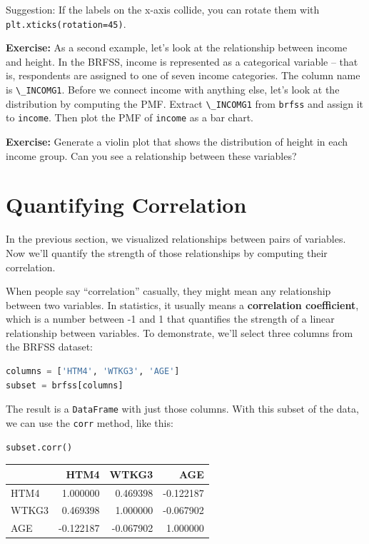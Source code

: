 Suggestion: If the labels on the x-axis collide, you can rotate them
with \passthrough{\lstinline!plt.xticks(rotation=45)!}.

\textbf{Exercise:} As a second example, let's look at the relationship
between income and height. In the BRFSS, income is represented as a
categorical variable -- that is, respondents are assigned to one of
seven income categories. The column name is
\passthrough{\lstinline!\_INCOMG1!}. Before we connect income with
anything else, let's look at the distribution by computing the PMF.
Extract \passthrough{\lstinline!\_INCOMG1!} from
\passthrough{\lstinline!brfss!} and assign it to
\passthrough{\lstinline!income!}. Then plot the PMF of
\passthrough{\lstinline!income!} as a bar chart.

\textbf{Exercise:} Generate a violin plot that shows the distribution of
height in each income group. Can you see a relationship between these
variables?

\section{Quantifying Correlation}\label{quantifying-correlation}

In the previous section, we visualized relationships between pairs of
variables. Now we'll quantify the strength of those relationships by
computing their correlation.

When people say ``correlation'' casually, they might mean any
relationship between two variables. In statistics, it usually means a
\textbf{correlation coefficient}, which is a number between -1 and 1
that quantifies the strength of a linear relationship between variables.
To demonstrate, we'll select three columns from the BRFSS dataset:

\begin{lstlisting}[language=Python,style=source]
columns = ['HTM4', 'WTKG3', 'AGE']
subset = brfss[columns]
\end{lstlisting}

The result is a \passthrough{\lstinline!DataFrame!} with just those
columns. With this subset of the data, we can use the
\passthrough{\lstinline!corr!} method, like this:

\begin{lstlisting}[language=Python,style=source]
subset.corr()
\end{lstlisting}

\begin{tabular}{lrrr}
\midrule
 & HTM4 & WTKG3 & AGE \\
\midrule
HTM4 & 1.000000 & 0.469398 & -0.122187 \\
WTKG3 & 0.469398 & 1.000000 & -0.067902 \\
AGE & -0.122187 & -0.067902 & 1.000000 \\
\midrule
\end{tabular}

